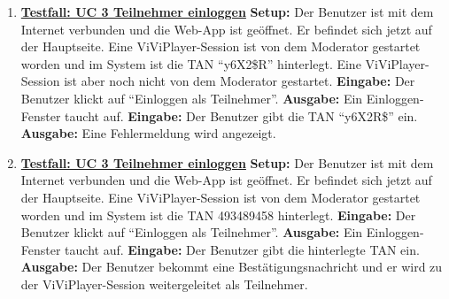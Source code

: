 \begin{enumerate}
	\item \underline{\textbf{Testfall: UC 3 Teilnehmer einloggen}} \linebreak
	\textbf{Setup:} Der Benutzer ist mit dem Internet verbunden und die Web-App ist geöffnet. Er befindet sich jetzt auf der Hauptseite. Eine ViViPlayer-Session ist von dem Moderator gestartet worden und im System ist die TAN ``y6X2\$R'' hinterlegt.
	Eine ViViPlayer-Session ist aber noch nicht von dem Moderator gestartet. \linebreak
	\textbf{Eingabe:} Der Benutzer klickt auf ``Einloggen als Teilnehmer''. \linebreak
	\textbf{Ausgabe:} Ein Einloggen-Fenster taucht auf. \linebreak
	\textbf{Eingabe:} Der Benutzer gibt die TAN ``y6X2R\$'' ein. \linebreak
	\textbf{Ausgabe:} Eine Fehlermeldung wird angezeigt.
	
	\item \underline{\textbf{Testfall: UC 3 Teilnehmer einloggen}} \linebreak
	\textbf{Setup:} Der Benutzer ist mit dem Internet verbunden und die Web-App ist geöffnet. Er befindet sich jetzt auf der Hauptseite. Eine ViViPlayer-Session ist von dem Moderator gestartet worden und im System ist die TAN 493489458 hinterlegt. \linebreak
	\textbf{Eingabe:} Der Benutzer klickt auf ``Einloggen als Teilnehmer''. \linebreak
	\textbf{Ausgabe:} Ein Einloggen-Fenster taucht auf. \linebreak
	\textbf{Eingabe:} Der Benutzer gibt die hinterlegte TAN ein. \linebreak
	\textbf{Ausgabe:} Der Benutzer bekommt eine Bestätigungsnachricht und er wird zu der ViViPlayer-Session weitergeleitet als Teilnehmer.


\end{enumerate}
